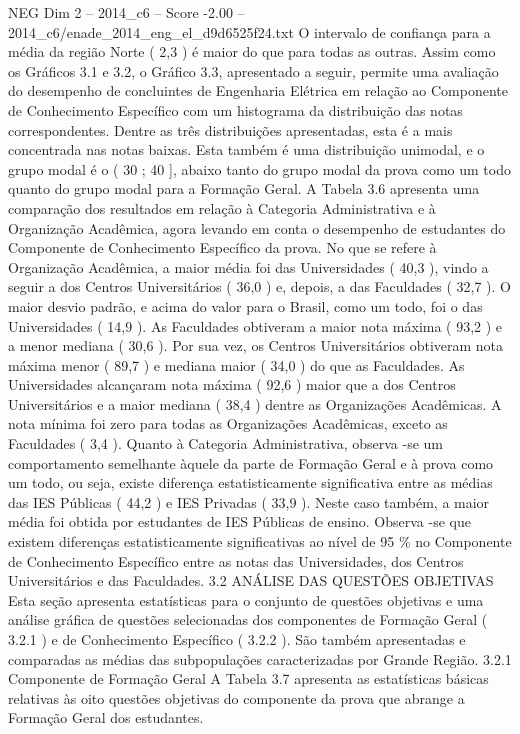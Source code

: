 \begin{textsample}{NEG Dim 2 – 2014\_c6 – Score -2.00 – 2014\_c6/enade\_2014\_eng\_el\_d9d6525f24.txt}
O intervalo de confiança para a média da região Norte ( 2,3 ) é maior do que para todas as outras.
Assim como os Gráficos 3.1 e 3.2, o Gráfico 3.3, apresentado a seguir, permite uma avaliação do desempenho de concluintes de Engenharia Elétrica em relação ao Componente de Conhecimento Específico com um histograma da distribuição das notas correspondentes.
Dentre as três distribuições apresentadas, esta é a mais concentrada nas notas baixas.
Esta também é uma distribuição unimodal, e o grupo modal é o ( 30 ; 40 ], abaixo tanto do grupo modal da prova como um todo quanto do grupo modal para a Formação Geral.
A Tabela 3.6 apresenta uma comparação dos resultados em relação à Categoria Administrativa e à Organização Acadêmica, agora levando em conta o desempenho de estudantes do Componente de Conhecimento Específico da prova.
No que se refere à Organização Acadêmica, a maior média foi das Universidades ( 40,3 ), vindo a seguir a dos Centros Universitários ( 36,0 ) e, depois, a das Faculdades ( 32,7 ).
O maior desvio padrão, e acima do valor para o Brasil, como um todo, foi o das Universidades ( 14,9 ).
As Faculdades obtiveram a maior nota máxima ( 93,2 ) e a menor mediana ( 30,6 ).
Por sua vez, os Centros Universitários obtiveram nota máxima menor ( 89,7 ) e mediana maior ( 34,0 ) do que as Faculdades.
As Universidades alcançaram nota máxima ( 92,6 ) maior que a dos Centros Universitários e a maior mediana ( 38,4 ) dentre as Organizações Acadêmicas.
A nota mínima foi zero para todas as Organizações Acadêmicas, exceto as Faculdades ( 3,4 ).
Quanto à Categoria Administrativa, observa -se um comportamento semelhante àquele da parte de Formação Geral e à prova como um todo, ou seja, existe diferença estatisticamente significativa entre as médias das IES Públicas ( 44,2 ) e IES Privadas ( 33,9 ).
Neste caso também, a maior média foi obtida por estudantes de IES Públicas de ensino.
Observa -se que existem diferenças estatisticamente significativas ao nível de 95 \% no Componente de Conhecimento Específico entre as notas das Universidades, dos Centros Universitários e das Faculdades. 3.2 ANÁLISE DAS QUESTÕES OBJETIVAS Esta seção apresenta estatísticas para o conjunto de questões objetivas e uma análise gráfica de questões selecionadas dos componentes de Formação Geral ( 3.2.1 ) e de Conhecimento Específico ( 3.2.2 ).
São também apresentadas e comparadas as médias das subpopulações caracterizadas por Grande Região. 3.2.1 Componente de Formação Geral A Tabela 3.7 apresenta as estatísticas básicas relativas às oito questões objetivas do componente da prova que abrange a Formação Geral dos estudantes.

\end{textsample}
